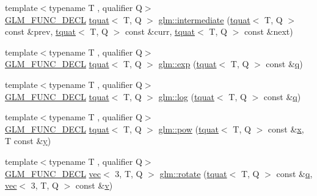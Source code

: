 \begin{DoxyCompactItemize}
\item 
{\footnotesize template$<$typename T , qualifier Q$>$ }\\\hyperlink{setup_8hpp_ab2d052de21a70539923e9bcbf6e83a51}{G\+L\+M\+\_\+\+F\+U\+N\+C\+\_\+\+D\+E\+CL} \hyperlink{structglm_1_1tquat}{tquat}$<$ T, Q $>$ \hyperlink{group__gtx__quaternion_gac9be2084562a52ae8923813233563a28}{glm\+::intermediate} (\hyperlink{structglm_1_1tquat}{tquat}$<$ T, Q $>$ const \&prev, \hyperlink{structglm_1_1tquat}{tquat}$<$ T, Q $>$ const \&curr, \hyperlink{structglm_1_1tquat}{tquat}$<$ T, Q $>$ const \&next)
\item 
{\footnotesize template$<$typename T , qualifier Q$>$ }\\\hyperlink{setup_8hpp_ab2d052de21a70539923e9bcbf6e83a51}{G\+L\+M\+\_\+\+F\+U\+N\+C\+\_\+\+D\+E\+CL} \hyperlink{structglm_1_1tquat}{tquat}$<$ T, Q $>$ \hyperlink{group__gtx__quaternion_ga72275e87ce62dc75a06d39a6c049835c}{glm\+::exp} (\hyperlink{structglm_1_1tquat}{tquat}$<$ T, Q $>$ const \&\hyperlink{_s_d_l__opengl_8h_a8fc1e7b9baaae687804c7eed46ca09c6}{q})
\item 
{\footnotesize template$<$typename T , qualifier Q$>$ }\\\hyperlink{setup_8hpp_ab2d052de21a70539923e9bcbf6e83a51}{G\+L\+M\+\_\+\+F\+U\+N\+C\+\_\+\+D\+E\+CL} \hyperlink{structglm_1_1tquat}{tquat}$<$ T, Q $>$ \hyperlink{group__gtx__quaternion_gaad510f1a4ea26994b341c094ec4f4eed}{glm\+::log} (\hyperlink{structglm_1_1tquat}{tquat}$<$ T, Q $>$ const \&\hyperlink{_s_d_l__opengl_8h_a8fc1e7b9baaae687804c7eed46ca09c6}{q})
\item 
{\footnotesize template$<$typename T , qualifier Q$>$ }\\\hyperlink{setup_8hpp_ab2d052de21a70539923e9bcbf6e83a51}{G\+L\+M\+\_\+\+F\+U\+N\+C\+\_\+\+D\+E\+CL} \hyperlink{structglm_1_1tquat}{tquat}$<$ T, Q $>$ \hyperlink{group__gtx__quaternion_gad382fc37392d537aecf2245a4597d8a3}{glm\+::pow} (\hyperlink{structglm_1_1tquat}{tquat}$<$ T, Q $>$ const \&\hyperlink{_s_d_l__opengl_8h_ad0e63d0edcdbd3d79554076bf309fd47}{x}, T const \&\hyperlink{_s_d_l__opengl_8h_a1675d9d7bb68e1657ff028643b4037e3}{y})
\item 
{\footnotesize template$<$typename T , qualifier Q$>$ }\\\hyperlink{setup_8hpp_ab2d052de21a70539923e9bcbf6e83a51}{G\+L\+M\+\_\+\+F\+U\+N\+C\+\_\+\+D\+E\+CL} \hyperlink{structglm_1_1vec}{vec}$<$ 3, T, Q $>$ \hyperlink{group__gtx__quaternion_ga49730f975e7f0ee3862a20b767aba583}{glm\+::rotate} (\hyperlink{structglm_1_1tquat}{tquat}$<$ T, Q $>$ const \&\hyperlink{_s_d_l__opengl_8h_a8fc1e7b9baaae687804c7eed46ca09c6}{q}, \hyperlink{structglm_1_1vec}{vec}$<$ 3, T, Q $>$ const \&\hyperlink{_s_d_l__opengl_8h_a10a82eabcb59d2fcd74acee063775f90}{v})

\end{DoxyCompactItemize}
